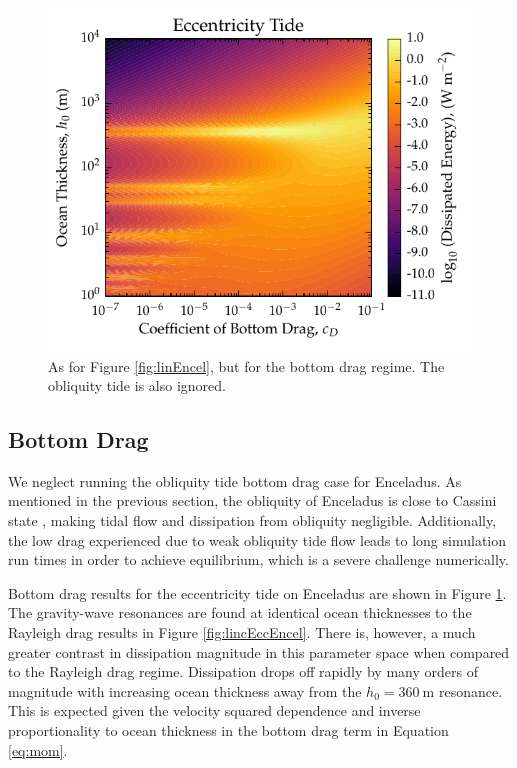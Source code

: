 \begin{figure}[!t]
    \centering
    \includegraphics[width=0.55\linewidth]{Figures/enceladus_bottom}
\caption{As for Figure \ref{fig:linEncel}, but for the bottom drag regime. The obliquity tide is also ignored. \label{fig:botEncel}}
\end{figure}

\subsection{Bottom Drag}

We neglect running the obliquity tide bottom drag case for Enceladus. As mentioned in the previous section, the obliquity of Enceladus is close to Cassini state \citep{chen2011obliquity,baland2016obliquity}, making tidal flow and dissipation from obliquity negligible. Additionally, the low drag experienced due to weak obliquity tide flow leads to long simulation run times in order to achieve equilibrium, which is a severe challenge numerically.

Bottom drag results for the eccentricity tide on Enceladus are shown in Figure \ref{fig:botEncel}. The gravity-wave resonances are found at identical ocean thicknesses to the Rayleigh drag results in Figure \ref{fig:lincEccEncel}. There is, however, a much greater contrast in dissipation magnitude in this parameter space when compared to the Rayleigh drag regime. Dissipation drops off rapidly by many orders of magnitude with increasing ocean thickness away from the $h_0 = \SI{360}{\metre}$ resonance. This is expected given the velocity squared dependence and inverse proportionality to ocean thickness in the bottom drag term in Equation \ref{eq:mom}. 

